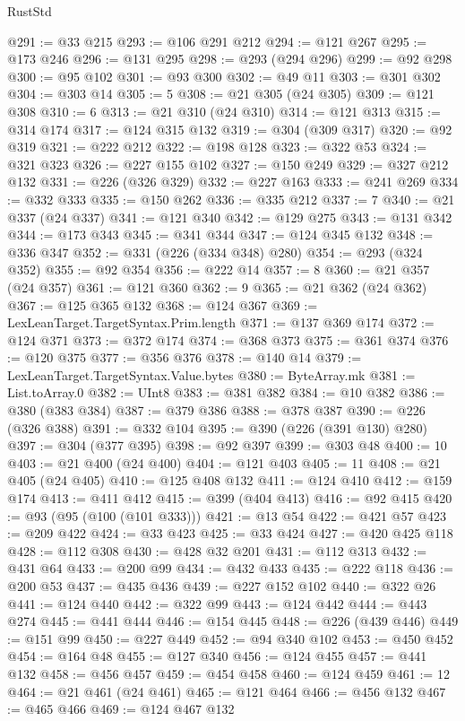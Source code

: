 \begin{lexlean}{RustStd}
\begin{coremodule}
@291 := @33 @215
@293 := @106 @291 @212
@294 := @121 @267
@295 := @173 @246
@296 := @131 @295
@298 := @293 (@294 @296)
@299 := @92 @298
@300 := @95 @102
@301 := @93 @300
@302 := @49 @11
@303 := @301 @302
@304 := @303 @14
@305 := 5
@308 := @21 @305 (@24 @305)
@309 := @121 @308
@310 := 6
@313 := @21 @310 (@24 @310)
@314 := @121 @313
@315 := @314 @174
@317 := @124 @315 @132
@319 := @304 (@309 @317)
@320 := @92 @319
@321 := @222 @212
@322 := @198 @128
@323 := @322 @53
@324 := @321 @323
@326 := @227 @155 @102
@327 := @150 @249
@329 := @327 @212 @132
@331 := @226 (@326 @329)
@332 := @227 @163
@333 := @241 @269
@334 := @332 @333
@335 := @150 @262
@336 := @335 @212
@337 := 7
@340 := @21 @337 (@24 @337)
@341 := @121 @340
@342 := @129 @275
@343 := @131 @342
@344 := @173 @343
@345 := @341 @344
@347 := @124 @345 @132
@348 := @336 @347
@352 := @331 (@226 (@334 @348) @280)
@354 := @293 (@324 @352)
@355 := @92 @354
@356 := @222 @14
@357 := 8
@360 := @21 @357 (@24 @357)
@361 := @121 @360
@362 := 9
@365 := @21 @362 (@24 @362)
@367 := @125 @365 @132
@368 := @124 @367
@369 := LexLeanTarget.TargetSyntax.Prim.length
@371 := @137 @369 @174
@372 := @124 @371
@373 := @372 @174
@374 := @368 @373
@375 := @361 @374
@376 := @120 @375
@377 := @356 @376
@378 := @140 @14
@379 := LexLeanTarget.TargetSyntax.Value.bytes
@380 := ByteArray.mk
@381 := List.toArray.{0}
@382 := UInt8
@383 := @381 @382
@384 := @10 @382
@386 := @380 (@383 @384)
@387 := @379 @386
@388 := @378 @387
@390 := @226 (@326 @388)
@391 := @332 @104
@395 := @390 (@226 (@391 @130) @280)
@397 := @304 (@377 @395)
@398 := @92 @397
@399 := @303 @48
@400 := 10
@403 := @21 @400 (@24 @400)
@404 := @121 @403
@405 := 11
@408 := @21 @405 (@24 @405)
@410 := @125 @408 @132
@411 := @124 @410
@412 := @159 @174
@413 := @411 @412
@415 := @399 (@404 @413)
@416 := @92 @415
@420 := @93 (@95 (@100 (@101 @333)))
@421 := @13 @54
@422 := @421 @57
@423 := @209 @422
@424 := @33 @423
@425 := @33 @424
@427 := @420 @425 @118
@428 := @112 @308
@430 := @428 @32 @201
@431 := @112 @313
@432 := @431 @64
@433 := @200 @99
@434 := @432 @433
@435 := @222 @118
@436 := @200 @53
@437 := @435 @436
@439 := @227 @152 @102
@440 := @322 @26
@441 := @124 @440
@442 := @322 @99
@443 := @124 @442
@444 := @443 @274
@445 := @441 @444
@446 := @154 @445
@448 := @226 (@439 @446)
@449 := @151 @99
@450 := @227 @449
@452 := @94 @340 @102
@453 := @450 @452
@454 := @164 @48
@455 := @127 @340
@456 := @124 @455
@457 := @441 @132
@458 := @456 @457
@459 := @454 @458
@460 := @124 @459
@461 := 12
@464 := @21 @461 (@24 @461)
@465 := @121 @464
@466 := @456 @132
@467 := @465 @466
@469 := @124 @467 @132

\end{coremodule}
\end{lexlean}
